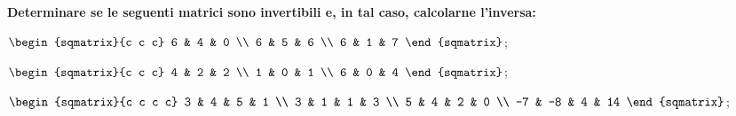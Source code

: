 \begin{exer}
    \textbf{Determinare se le seguenti matrici sono invertibili e, in tal caso, calcolarne l'inversa:}
    
    $
        \begin{sqmatrix}{c c c}
            6 & 4 & 0 \\
            6 & 5 & 6 \\
            6 & 1 & 7
        \end{sqmatrix}
    $;

    $
        \begin{sqmatrix}{c c c}
            4 & 2 & 2 \\
            1 & 0 & 1 \\
            6 & 0 & 4
        \end{sqmatrix}
    $;

    $
        \begin{sqmatrix}{c c c c}
            3 & 4 & 5 & 1 \\
            3 & 1 & 1 & 3 \\
            5 & 4 & 2 & 0 \\
            -7 & -8 & 4 & 14
        \end{sqmatrix}
    $;
\end{exer}

